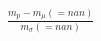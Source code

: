 \documentclass[preview]{standalone}
\begin{document}
\begin{center}
$\frac{m_p - m_\mu (= nan)}{m_\sigma (= nan)}$
\end{center}
\end{document}
